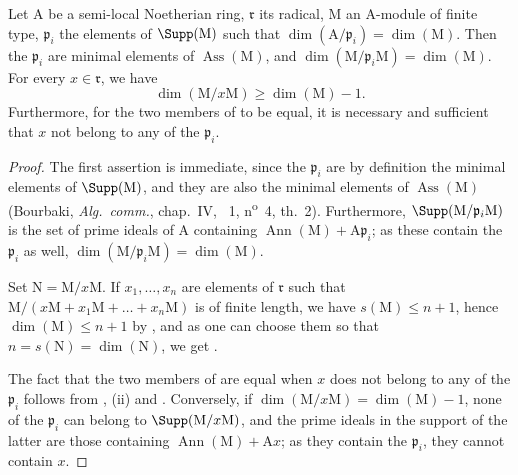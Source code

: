 \begin{proposition}[16.3.4]
\label{0.16.3.4}
Let $\mathrm{A}$ be a semi-local Noetherian ring, $\mathfrak{r}$ its radical, $\mathrm{M}$ an $\mathrm{A}$-module of finite type, $\mathfrak{p}_i$ the elements of $\Supp(\mathrm{M})$ such that $\dim(\mathrm{A}/\mathfrak{p}_i)=\dim(\mathrm{M})$.
Then the $\mathfrak{p}_i$ are minimal elements of $\operatorname{Ass}(\mathrm{M})$, and $\dim(\mathrm{M}/\mathfrak{p}_i\mathrm{M})=\dim(\mathrm{M})$.
For every $x\in\mathfrak{r}$, we have
\begin{equation}
\label{0.16.3.4.1}
\tag{16.3.4.1}
  \dim(\mathrm{M}/x\mathrm{M})\geq\dim(\mathrm{M})-1.
\end{equation}
Furthermore, for the two members of  to be equal, it is necessary and sufficient that $x$ not belong to any of the $\mathfrak{p}_i$.
\end{proposition}

\begin{proof}
The first assertion is immediate, since the $\mathfrak{p}_i$ are by definition the minimal elements of $\Supp(\mathrm{M})$, and they are also the minimal elements of $\operatorname{Ass}(\mathrm{M})$ (Bourbaki, \emph{Alg.~comm.}, chap.~IV, \textsection~1, n\textsuperscript{o}~4, th.~2).
Furthermore, $\Supp(\mathrm{M}/\mathfrak{p}_i\mathrm{M})$ is the set of prime ideals of $\mathrm{A}$ containing $\operatorname{Ann}(\mathrm{M})+\mathrm{A}\mathfrak{p}_i$; as these contain the $\mathfrak{p}_i$ as well, $\dim(\mathrm{M}/\mathfrak{p}_i\mathrm{M})=\dim(\mathrm{M})$.

Set $\mathrm{N}=\mathrm{M}/x\mathrm{M}$.
If $x_1,\ldots,x_n$ are elements of $\mathfrak{r}$ such that $\mathrm{M}/(x\mathrm{M}+x_1\mathrm{M}+\ldots+x_n\mathrm{M})$ is of finite length, we have $s(\mathrm{M})\leq n+1$, hence $\dim(\mathrm{M})\leq n+1$ by , and as one can choose them so that $n=s(\mathrm{N})=\dim(\mathrm{N})$, we get .

The fact that the two members of  are equal when $x$ does not belong to any of the $\mathfrak{p}_i$ follows from , (ii) and .
Conversely, if $\dim(\mathrm{M}/x\mathrm{M})=\dim(\mathrm{M})-1$, none of the $\mathfrak{p}_i$ can belong to $\Supp(\mathrm{M}/x\mathrm{M})$, and the prime ideals in the support of the latter are those containing $\operatorname{Ann}(\mathrm{M})+\mathrm{A}x$; as they contain the $\mathfrak{p}_i$, they cannot contain $x$.
\end{proof}

